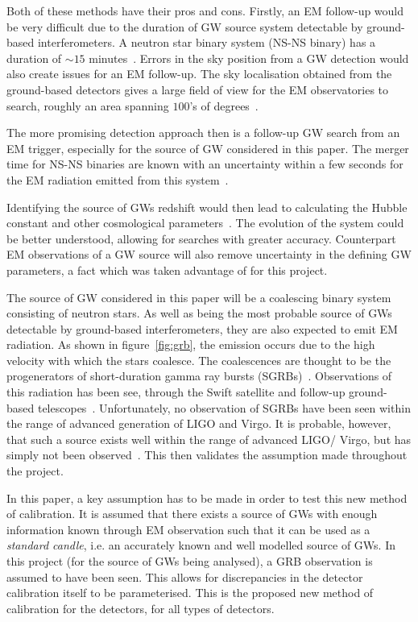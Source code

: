 \documentclass[12pt]{iopart}
\begin{document}
Both of these methods have their pros and cons. Firstly, an EM follow-up would
be very difficult due to the duration of GW source system detectable by
ground-based interferometers. A neutron star binary system (NS-NS binary) has a
duration of $\sim15$ minutes~\cite{bnstime}.  Errors in the sky position from a
GW detection would also create issues for an EM follow-up. The sky localisation
obtained from the ground-based detectors gives a large field of view for the EM
observatories to search, roughly an area spanning $100$'s of
degrees~\cite{grb}.

The more promising detection approach then is a follow-up GW search from an EM
trigger, especially for the source of GW considered in this paper. The merger
time for NS-NS binaries are known with an uncertainty within a few seconds for
the EM radiation emitted from this system~\cite{grb}.


Identifying the source of GWs redshift would then lead to calculating the
Hubble constant and other cosmological parameters~\cite{Schutz}. The evolution
of the system could be better understood, allowing for searches with greater
accuracy. Counterpart EM observations of a GW source will also remove
uncertainty in the defining GW parameters, a fact which was taken advantage of
for this project.


The source of GW considered in this paper will be a coalescing binary system
consisting of neutron stars. As well as being the most probable source of GWs
detectable by ground-based interferometers, they are also expected to emit EM
radiation. As shown in figure~\ref{fig:grb}, the emission occurs due to the
high velocity with which the stars coalesce. The coalescences are thought to be
the progenerators of short-duration gamma ray bursts (SGRBs)~\cite{grb}.
Observations of this radiation has been see, through the Swift satellite and
follow-up ground-based telescopes~\cite{swift}. Unfortunately, no observation
of SGRBs have been seen within the range of advanced generation of LIGO and
Virgo. It is probable, however, that such a source exists well within the range
of advanced LIGO/ Virgo, but has simply not been observed~\cite{grb}. This then
validates the assumption made throughout the project.


In this paper, a key assumption has to be made in order to test this new method
of calibration. It is assumed that there exists a source of GWs with enough
information known through EM observation such that it can be used as a
\textit{standard candle}, i.e. an accurately known and well modelled source of
GWs. In this project (for the source of GWs being analysed), a GRB observation
is assumed to have been seen. This allows for discrepancies in the detector
calibration itself to be parameterised. This is the proposed new method of
calibration for the detectors, for all types of detectors.
\end{document}
